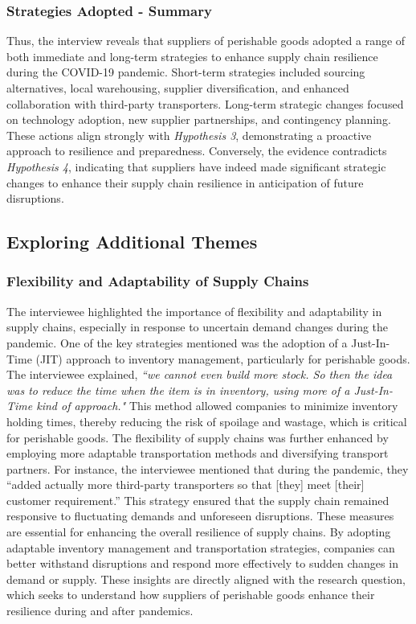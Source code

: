 \subsubsection{Strategies Adopted - Summary}

Thus, the interview reveals that suppliers of perishable goods adopted a range of both immediate and long-term strategies to enhance supply chain resilience during the COVID-19 pandemic. Short-term strategies included sourcing alternatives, local warehousing, supplier diversification, and enhanced collaboration with third-party transporters. Long-term strategic changes focused on technology adoption, new supplier partnerships, and contingency planning. These actions align strongly with \textit{Hypothesis 3}, demonstrating a proactive approach to resilience and preparedness. Conversely, the evidence contradicts \textit{Hypothesis 4}, indicating that suppliers have indeed made significant strategic changes to enhance their supply chain resilience in anticipation of future disruptions.


\subsection{Exploring Additional Themes}

\subsubsection{Flexibility and Adaptability of Supply Chains}
The interviewee highlighted the importance of flexibility and adaptability in supply chains, especially in response to uncertain demand changes during the pandemic. One of the key strategies mentioned was the adoption of a Just-In-Time (JIT) approach to inventory management, particularly for perishable goods. The interviewee explained, \textit{“we cannot even build more stock. So then the idea was to reduce the time when the item is in inventory, using more of a Just-In-Time kind of approach."} This method allowed companies to minimize inventory holding times, thereby reducing the risk of spoilage and wastage, which is critical for perishable goods. The flexibility of supply chains was further enhanced by employing more adaptable transportation methods and diversifying transport partners. For instance, the interviewee mentioned that during the pandemic, they “added actually more third-party transporters so that [they] meet [their] customer requirement.” This strategy ensured that the supply chain remained responsive to fluctuating demands and unforeseen disruptions.  These measures are essential for enhancing the overall resilience of supply chains. By adopting adaptable inventory management and transportation strategies, companies can better withstand disruptions and respond more effectively to sudden changes in demand or supply. These insights are directly aligned with the research question, which seeks to understand how suppliers of perishable goods enhance their resilience during and after pandemics.

